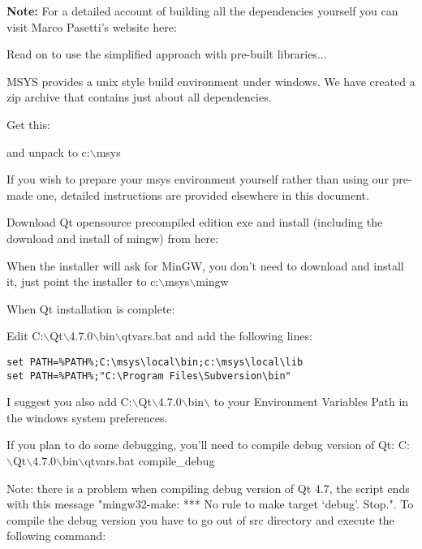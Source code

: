 \textbf{Note:} For a detailed account of building all the dependencies yourself you
can visit Marco Pasetti's website here:


Read on to use the simplified approach with pre-built libraries...

MSYS provides a unix style build environment under windows. We have created a
zip archive that contains just about all dependencies.

Get this: 


and unpack to c:$\backslash$msys

If you wish to prepare your msys environment yourself rather than using 
our pre-made one, detailed instructions are provided elsewhere in this
document.

Download Qt opensource precompiled edition exe and install (including the
download and install of mingw) from here:


When the installer will ask for MinGW, you don't need to download and install
it, just point the installer to c:$\backslash$msys$\backslash$mingw

When Qt installation is complete:

Edit C:$\backslash$Qt$\backslash$4.7.0$\backslash$bin$\backslash$qtvars.bat and add the following lines:

\begin{verbatim}
set PATH=%PATH%;C:\msys\local\bin;c:\msys\local\lib 
set PATH=%PATH%;"C:\Program Files\Subversion\bin" 
\end{verbatim}

I suggest you also add C:$\backslash$Qt$\backslash$4.7.0$\backslash$bin$\backslash$ to your Environment Variables Path in
the windows system preferences.

If you plan to do some debugging, you'll need to compile debug version of Qt:
C:$\backslash$Qt$\backslash$4.7.0$\backslash$bin$\backslash$qtvars.bat compile\_debug

Note: there is a problem when compiling debug version of Qt 4.7, the script ends with
this message  "mingw32-make: *** No rule to make target `debug'.  Stop.". To 
compile the debug version you have to go out of src directory and execute the
following command:

